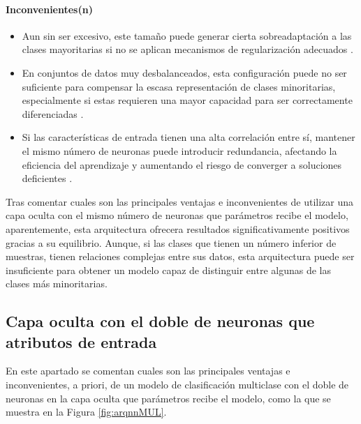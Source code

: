 \paragraph{Inconvenientes(n)}
\begin{itemize}
	\item Aun sin ser excesivo, este tamaño puede generar cierta sobreadaptación a las clases mayoritarias si no se aplican mecanismos de regularización adecuados \cite{goodfellow2016deep}.
	\item En conjuntos de datos muy desbalanceados, esta configuración puede no ser suficiente para compensar la escasa representación de clases minoritarias, especialmente si estas requieren una mayor capacidad para ser correctamente diferenciadas \cite{he2009learning}.
	\item Si las características de entrada tienen una alta correlación entre sí, mantener el mismo número de neuronas puede introducir redundancia, afectando la eficiencia del aprendizaje y aumentando el riesgo de converger a soluciones deficientes \cite{bengio2013representation}.
\end{itemize}

Tras comentar cuales son las principales ventajas e inconvenientes de utilizar una capa oculta con el mismo número de neuronas que parámetros recibe el modelo, aparentemente, esta arquitectura ofrecera resultados significativamente positivos gracias a su equilibrio. Aunque, si las clases que tienen un número inferior de muestras, tienen relaciones complejas entre sus datos, esta arquitectura puede ser insuficiente para obtener un modelo capaz de distinguir entre algunas de las clases más minoritarias.

\subsection{Capa oculta con el doble de neuronas que atributos de entrada}\label{sec:VIMUL98}
En este apartado se comentan cuales son las principales ventajas e inconvenientes, a priori, de un modelo de clasificación multiclase con el doble de neuronas en la capa oculta que parámetros recibe el modelo, como la que se muestra en la Figura \ref{fig:arqnnMUL}.

